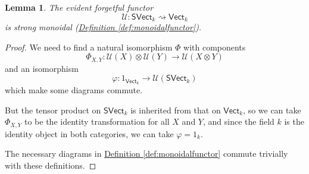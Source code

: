 \documentclass[a4paper]{report}
\theoremstyle{definition}
\theoremstyle{plain}
\newtheorem{lemma}{Lemma}[section]
\theoremstyle{remark}
\begin{document}
\begin{lemma}
  The evident forgetful functor 
  \begin{equation*}
    \mathcal{U}\colon \mathsf{SVect}_{k} \rightsquigarrow \mathsf{Vect}_{k}
  \end{equation*}
  is strong monoidal (\hyperref[def:monoidalfunctor]{Definition \ref*{def:monoidalfunctor}}).
\end{lemma}
\begin{proof}
  We need to find a natural isomorphism $\Phi$ with components 
  \begin{equation*}
    \Phi_{X, Y}\colon \mathcal{U}(X) \otimes \mathcal{U}(Y) \to \mathcal{U}(X \otimes Y)
  \end{equation*}
  and an isomorphism
  \begin{equation*}
    \varphi\colon 1_{\mathsf{Vect}_{k}} \to \mathcal{U}(\mathsf{SVect}_{k})
  \end{equation*}
  which make some diagrams commute.

  But the tensor product on $\mathsf{SVect}_{k}$ is inherited from that on $\mathsf{Vect}_{k}$, so we can take $\Phi_{X, Y}$ to be the identity transformation for all $X$ and $Y$, and since the field $k$ is the identity object in both categories, we can take $\varphi = 1_{k}$.

  The necessary diagrams in \hyperref[def:monoidalfunctor]{Definition \ref*{def:monoidalfunctor}} commute trivially with these definitions.
\end{proof} 
\end{document}
